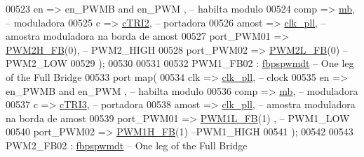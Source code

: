 \begin{DoxyCode}
00523          en => en\_PWMB \textcolor{keywordflow}{and} en\_PWM  ,\textcolor{keyword}{ -- habilta modulo}
00524          comp  => \hyperlink{class_d_e0___n_a_n_o___v_f_1_1_m_a_i_n_ad0814aaad64ee4aa4283f091e1cc4dfc}{mb},\textcolor{keyword}{ -- moduladora     }
00525          c => \hyperlink{class_d_e0___n_a_n_o___v_f_1_1_m_a_i_n_a0691f44fd4ef0a19b491e285cbb23286}{cTRI2},\textcolor{keyword}{ -- portadora}
00526          amost => \hyperlink{class_d_e0___n_a_n_o___v_f_1_1_m_a_i_n_a1d63ebfc050c1099e1dff991817ec3b0}{clk\_pll},\textcolor{keyword}{ -- amostra moduladora na borda de amost}
00527          port\_PWM01  => \hyperlink{class_d_e0___n_a_n_o___v_f_a7efac822a270a6c828ef5eb2cc090127}{PWM2H\_FB}\textcolor{vhdlchar}{(}\textcolor{vhdllogic}{0}\textcolor{vhdlchar}{)},\textcolor{keyword}{ -- PWM2\_HIGH}
00528          port\_PWM02 => \hyperlink{class_d_e0___n_a_n_o___v_f_aefa13a97661cae3b7b87245ed460abe5}{PWM2L\_FB}\textcolor{vhdlchar}{(}\textcolor{vhdllogic}{0}\textcolor{vhdlchar}{)}\textcolor{keyword}{   -- PWM2\_LOW}
00529          \textcolor{vhdlchar}{)};         
00530 
00531 
00532 PWM1\_FB02 : \hyperlink{classfbpspwmdt}{fbpspwmdt} -- One leg \textcolor{keywordflow}{of} the Full Bridge
00533     \textcolor{keywordflow}{port} \textcolor{keywordflow}{map}( 
00534          clk => \hyperlink{class_d_e0___n_a_n_o___v_f_1_1_m_a_i_n_a1d63ebfc050c1099e1dff991817ec3b0}{clk\_pll},\textcolor{keyword}{ -- clock}
00535          en => en\_PWMB \textcolor{keywordflow}{and} en\_PWM  ,\textcolor{keyword}{ -- habilta modulo}
00536          comp  => \hyperlink{class_d_e0___n_a_n_o___v_f_1_1_m_a_i_n_ad0814aaad64ee4aa4283f091e1cc4dfc}{mb},\textcolor{keyword}{ -- moduladora     }
00537          c => \hyperlink{class_d_e0___n_a_n_o___v_f_1_1_m_a_i_n_a5629e2e1f290ee8718490a7f096055fe}{cTRI3},\textcolor{keyword}{ -- portadora}
00538          amost => \hyperlink{class_d_e0___n_a_n_o___v_f_1_1_m_a_i_n_a1d63ebfc050c1099e1dff991817ec3b0}{clk\_pll},\textcolor{keyword}{ -- amostra moduladora na borda de amost}
00539          port\_PWM01  => \hyperlink{class_d_e0___n_a_n_o___v_f_ac5cc3b06408f1596a61b08b946a9c1d0}{PWM1L\_FB}\textcolor{vhdlchar}{(}\textcolor{vhdllogic}{1}\textcolor{vhdlchar}{)} ,\textcolor{keyword}{ -- PWM1\_LOW}
00540          port\_PWM02 => \hyperlink{class_d_e0___n_a_n_o___v_f_a69e944b362281970fb9a0a5ec6f5f068}{PWM1H\_FB}\textcolor{vhdlchar}{(}\textcolor{vhdllogic}{1}\textcolor{vhdlchar}{)}\textcolor{keyword}{   --PWM1\_HIGH}
00541          \textcolor{vhdlchar}{)};  
00542         
00543 PWM2\_FB02 : \hyperlink{classfbpspwmdt}{fbpspwmdt} -- One leg \textcolor{keywordflow}{of} the Full Bridge

\end{DoxyCode}
